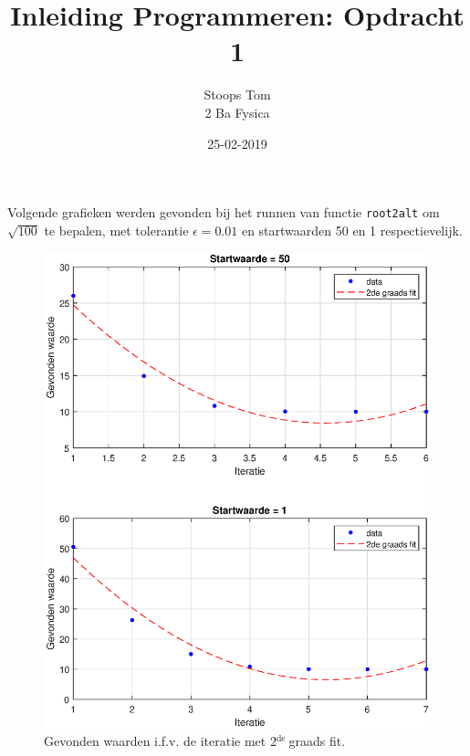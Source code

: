 \documentclass[a4paper,11pt]{article}
\title{\vspace{-75pt}Inleiding Programmeren: Opdracht 1\vspace{-10}}
\date{\vspace{-10pt}25-02-2019}
\author{Stoops Tom \\ 2 Ba Fysica}
\newcommand{\de}{$^\mathrm{de}\ $}
\begin{document}
\maketitle

\noindent
Volgende grafieken werden gevonden bij het runnen van functie \texttt{root2alt} om $\sqrt{100}$ te bepalen, met tolerantie $\epsilon = 0.01$ en startwaarden 50 en 1 respectievelijk.

\FloatBarrier
\begin{figure}[ht!]
  \includegraphics[width = \textwidth]{verwerking.eps}
  \caption{Gevonden waarden i.f.v. de iteratie met 2\de graads fit.}
  \label{intensiteit}
\end{figure}
\FloatBarrier
\end{document}
